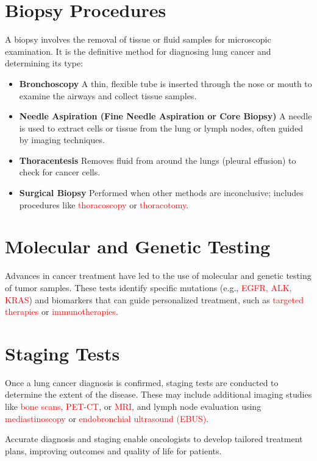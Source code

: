 \section{Biopsy Procedures} 
A biopsy involves the removal of tissue or fluid samples for microscopic examination. It is the definitive method for diagnosing lung cancer and determining its type:

\begin{highlight}
\begin{itemize}
    \item \textbf{Bronchoscopy} A thin, flexible tube is inserted through the nose or mouth to examine the airways and collect tissue samples.
    \item \textbf{Needle Aspiration (Fine Needle Aspiration or Core Biopsy)} A needle is used to extract cells or tissue from the lung or lymph nodes, often guided by imaging techniques.
    \item \textbf{Thoracentesis} Removes fluid from around the lungs (pleural effusion) to check for cancer cells.
    \item \textbf{Surgical Biopsy} Performed when other methods are inconclusive; includes procedures like \textcolor{red}{thoracoscopy} or \textcolor{red}{thoracotomy}.
\end{itemize}
\end{highlight}

\section{Molecular and Genetic Testing}
\begin{outline}
Advances in cancer treatment have led to the use of molecular and genetic testing of tumor samples. These tests identify specific mutations (e.g., \textcolor{red}{EGFR, ALK, KRAS}) and biomarkers that can guide personalized treatment, such as \textcolor{red}{targeted therapies} or \textcolor{red}{immunotherapies}.
\end{outline}

\section{Staging Tests} 
Once a lung cancer diagnosis is confirmed, staging tests are conducted to determine the extent of the disease. These may include additional imaging studies like \textcolor{red}{bone scans}, \textcolor{red}{PET-CT}, or \textcolor{red}{MRI}, and lymph node evaluation using \textcolor{red}{mediastinoscopy} or \textcolor{red}{endobronchial ultrasound (EBUS)}.

\begin{remark}
Accurate diagnosis and staging enable oncologists to develop tailored treatment plans, improving outcomes and quality of life for patients.
\end{remark}